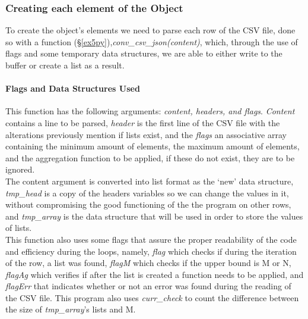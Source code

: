 \documentclass[11pt,a4paper,times]{report}
\begin{document}
\subsubsection{Creating each element of the Object}
To create the object's elements we need to parse each row of the CSV file,
done so with a function (\S\ref{ex5py}),\textit{conv\_csv\_json(content)}, which,
through the use of flags and some temporary data structures, we are able to
either write to the buffer or create a list as a result.

\paragraph{Flags and Data Structures Used} This function has the following
arguments: \textit{content, headers, and flags}. \textit{Content} contains
a line to be parsed, \textit{header} is the first line of the CSV file with the alterations
previously mention if lists exist, and the \textit{flags} an associative array
containing the minimum amount of elements, the maximum amount of elements,
and the aggregation function to be applied, if these do not exist,
they are to be ignored.\\
The content argument is converted into list format as the `new' data structure,
\textit{tmp\_head} is a copy of the headers variables so we can change the values in it,
without compromising the good functioning of the the program on other rows,
and \textit{tmp\_array} is the data structure that will be used in order to store the values
of lists.\\
This function also uses some flags that assure the proper readability of the code
and efficiency during the loops, namely, \textit{flag} which checks if during the iteration
of the row, a list was found, \textit{flagM} which checks if the upper bound is M or N,
\textit{flagAg} which verifies if after the list is created a function needs to be applied,
and \textit{flagErr} that indicates whether or not an error was found during the reading
of the CSV file. This program also uses \textit{curr\_check} to count the difference
between the size of \textit{tmp\_array}'s lists and M.
\end{document}

